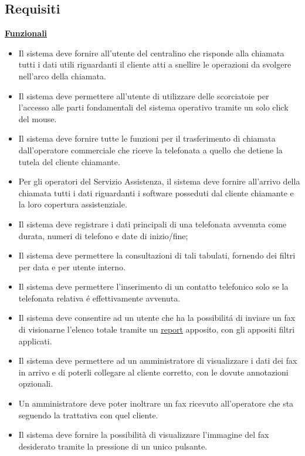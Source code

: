 \subsection{Requisiti}
\underline{\textbf{Funzionali}}
\begin{itemize}
\item Il sistema deve fornire all'utente del centralino che risponde alla chiamata tutti i dati utili riguardanti il cliente atti a snellire le operazioni da svolgere nell'arco della chiamata.
\item Il sistema deve permettere all'utente di utilizzare delle scorciatoie per l'accesso alle parti fondamentali del sistema operativo tramite un solo click del mouse.
\item Il sistema deve fornire tutte le funzioni per il trasferimento di chiamata dall'operatore commerciale che riceve la telefonata a quello che detiene la tutela del cliente chiamante.
\item Per gli operatori del Servizio Assistenza, il sistema deve fornire all'arrivo della chiamata tutti i dati riguardanti i software posseduti dal cliente chiamante e la loro copertura assistenziale.
\item Il sistema deve registrare i dati principali di una telefonata avvenuta come durata, numeri di telefono e date di inizio/fine; 
\item Il sistema deve permettere la consultazioni di tali tabulati, fornendo dei filtri per data e per utente interno. 
\item Il sistema deve permettere l'inserimento di un contatto telefonico solo se la telefonata relativa \'e effettivamente avvenuta.
\item Il sistema deve consentire ad un utente che ha la possibilit\'a di inviare un fax di visionarne l'elenco totale tramite un \hyperlink{report}{\underline{report}} apposito, con gli appositi filtri applicati.
\item Il sistema deve permettere ad un amministratore di visualizzare i dati dei fax in arrivo e di poterli collegare al cliente corretto, con le dovute annotazioni opzionali. 
\item Un amministratore deve poter inoltrare un fax ricevuto all'operatore che sta seguendo la trattativa con quel cliente.
\item Il sistema deve fornire la possibilit\`a di visualizzare l'immagine del fax desiderato tramite la pressione di un unico pulsante.
\end{itemize}

